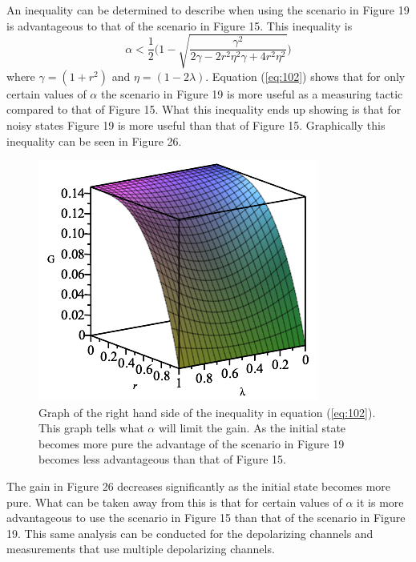 \documentclass[twocolumn]{article}
\begin{document}
An inequality can be determined to describe when using the scenario in Figure 19 is advantageous to that of the scenario in Figure 15. This inequality is
\begin{equation}\label{eq:102}
\alpha < \frac{1}{2}\Bigg(1-\sqrt{\frac{\gamma^2}{2\gamma-2r^2\eta^2\gamma+4r^2\eta^2}}\Bigg)
\end{equation}
where $\gamma=(1+r^2)$ and $\eta=(1-2\lambda)$. Equation (\ref{eq:102}) shows that for only certain values of $\alpha$ the scenario in Figure 19 is more useful as a measuring tactic compared to that of Figure 15. What this inequality ends up showing is that for noisy states Figure 19 is more useful than that of Figure 15. Graphically this inequality can be seen in Figure 26.
\newpage
\begin{figure}[h]
\begin{center}
\includegraphics[width=0.65\linewidth]{Phase-Flip-Alpha-Inequality-Graph.png}
\caption{Graph of the right hand side of the inequality in equation (\ref{eq:102}). This graph tells what $\alpha$ will limit the gain. As the initial state becomes more pure the advantage of the scenario in Figure 19 becomes less advantageous than that of Figure 15.}
\end{center}
\end{figure}
The gain in Figure 26 decreases significantly as the initial state becomes more pure. What can be taken away from this is that for certain values of $\alpha$ it is more advantageous to use the scenario in Figure 15 than that of the scenario in Figure 19. This same analysis can be conducted for the depolarizing channels and measurements that use multiple depolarizing channels.
\end{document}
